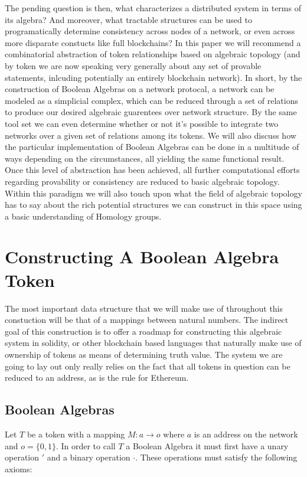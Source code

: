 \documentclass[12pt]{amsart}
\begin{document}
 The pending question is then, what characterizes a distributed system in terms of its algebra? And moreover, what tractable structures can be used to programatically determine consistency across nodes of a network, or even across more disparate constucts like full blockchains? In this paper we will recommend a combinatorial abstraction of token relationships based on algebraic topology (and by token we are now speaking very generally about any set of provable statements, inlcuding potentially an entirely blockchain network). In short, by the construction of Boolean Algebras on a network protocal, a network can be modeled as a simplicial complex, which can be reduced through a set of relations to produce our desired algebraic guarentees over network structure. By the same tool set we can even determine whether or not it's possible to integrate two networks over a given set of relations among its tokens. We will also discuss how the particular implementation of Boolean Algebras can be done in a multitude of ways depending on the circumstances, all yielding the same functional result. Once this level of abstraction has been achieved, all further computational efforts regarding provability or consistency are reduced to basic algebraic topology. Within this paradigm we will also touch upon what the field of algebraic topology has to say about the rich potential structures we can construct in this space using a basic understanding of Homology groups.


\section{Constructing A Boolean Algebra Token}
The most important data structure that we will make use of throughout this constuction will be that of a mappings between natural numbers. The indirect goal of this construction is to offer a roadmap for constructing this algebraic system in solidity, or other blockchain based languages that naturally make use of ownership of tokens as means of determining truth value. The system we are going to lay out only really relies on the fact that all tokens in question can be reduced to an address, as is the rule for Ethereum.

\subsection{Boolean Algebras}
Let $T$ be a token with a mapping $M:a\rightarrow o$ where $a$ is an address on the network and $o = \{0,1\}$. In order to call $T$ a Boolean Algebra it must first have a unary operation $'$ and a binary operation $\cdot$. These operations must satisfy the following axioms:\newline
\end{document}
